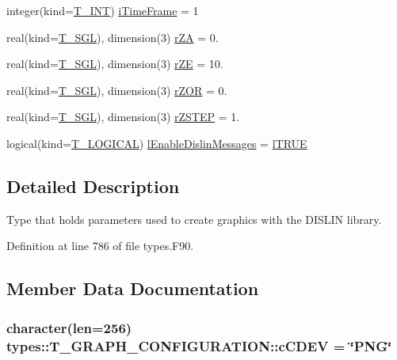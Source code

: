 \begin{DoxyCompactItemize}
\item 
integer(kind=\hyperlink{namespacetypes_a4e4d040a4425196c4d43be63e7e6103a}{T\_\-INT}) \hyperlink{typetypes_1_1_t___g_r_a_p_h___c_o_n_f_i_g_u_r_a_t_i_o_n_a123665495a3d529e1f524549593c9e8a}{iTimeFrame} = 1
\item 
real(kind=\hyperlink{namespacetypes_af3012489af4c138f271f1bce244b7e51}{T\_\-SGL}), dimension(3) \hyperlink{typetypes_1_1_t___g_r_a_p_h___c_o_n_f_i_g_u_r_a_t_i_o_n_ac5c4de6d335faf49fa4a32ab2e034d0c}{rZA} = 0.
\item 
real(kind=\hyperlink{namespacetypes_af3012489af4c138f271f1bce244b7e51}{T\_\-SGL}), dimension(3) \hyperlink{typetypes_1_1_t___g_r_a_p_h___c_o_n_f_i_g_u_r_a_t_i_o_n_a3ea6eb3ab869dbe908a650dfb11bcf98}{rZE} = 10.
\item 
real(kind=\hyperlink{namespacetypes_af3012489af4c138f271f1bce244b7e51}{T\_\-SGL}), dimension(3) \hyperlink{typetypes_1_1_t___g_r_a_p_h___c_o_n_f_i_g_u_r_a_t_i_o_n_a99655676433ac94e2a7a39424e226c7c}{rZOR} = 0.
\item 
real(kind=\hyperlink{namespacetypes_af3012489af4c138f271f1bce244b7e51}{T\_\-SGL}), dimension(3) \hyperlink{typetypes_1_1_t___g_r_a_p_h___c_o_n_f_i_g_u_r_a_t_i_o_n_a69159f3b7eaa91e1f3268f1f09af6a2d}{rZSTEP} = 1.
\item 
logical(kind=\hyperlink{namespacetypes_adfa8f4f6096bb7bdbb93f36b911dcaad}{T\_\-LOGICAL}) \hyperlink{typetypes_1_1_t___g_r_a_p_h___c_o_n_f_i_g_u_r_a_t_i_o_n_a5deb2e076ef641e35f5f531d303cf81c}{lEnableDislinMessages} = \hyperlink{namespacetypes_a440f71bd0dd529ae3aaa8309171baa67}{lTRUE}
\end{DoxyCompactItemize}


\subsection{Detailed Description}
Type that holds parameters used to create graphics with the DISLIN library. 

Definition at line 786 of file types.F90.



\subsection{Member Data Documentation}
\hypertarget{typetypes_1_1_t___g_r_a_p_h___c_o_n_f_i_g_u_r_a_t_i_o_n_aadedfc88c0bcf38630174f5b7a6a5447}{
\subsubsection[{cCDEV}]{\setlength{\rightskip}{0pt plus 5cm}character(len=256) {\bf types::T\_\-GRAPH\_\-CONFIGURATION::cCDEV} = \char`\"{}PNG\char`\"{}}}
\label{typetypes_1_1_t___g_r_a_p_h___c_o_n_f_i_g_u_r_a_t_i_o_n_aadedfc88c0bcf38630174f5b7a6a5447}


